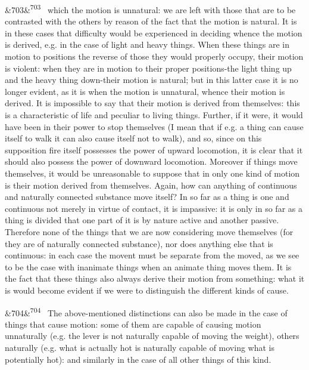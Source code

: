 \documentclass[12pt]{article}
\newcommand{\para}[1][]{\par\noindent\ifx&#1&\else\textsuperscript{\footnotesize #1}~\fi}
\begin{document}
\para[703] which the motion is unnatural: we are left with those that are to be contrasted with the others by reason of the fact that the motion is natural. It is in these cases that difficulty would be experienced in deciding whence the motion is derived, e.g. in the case of light and heavy things. When these things are in motion to positions the reverse of those they would properly occupy, their motion is violent: when they are in motion to their proper positions-the light thing up and the heavy thing down-their motion is natural; but in this latter case it is no longer evident, as it is when the motion is unnatural, whence their motion is derived. It is impossible to say that their motion is derived from themselves: this is a characteristic of life and peculiar to living things. Further, if it were, it would have been in their power to stop themselves (I mean that if e.g. a thing can cause itself to walk it can also cause itself not to walk), and so, since on this supposition fire itself possesses the power of upward locomotion, it is clear that it should also possess the power of downward locomotion. Moreover if things move themselves, it would be unreasonable to suppose that in only one kind of motion is their motion derived from themselves. Again, how can anything of continuous and naturally connected substance move itself? In so far as a thing is one and continuous not merely in virtue of contact, it is impassive: it is only in so far as a thing is divided that one part of it is by nature active and another passive. Therefore none of the things that we are now considering move themselves (for they are of naturally connected substance), nor does anything else that is continuous: in each case the movent must be separate from the moved, as we see to be the case with inanimate things when an animate thing moves them. It is the fact that these things also always derive their motion from something: what it is would become evident if we were to distinguish the different kinds of cause.

\para[704] The above-mentioned distinctions can also be made in the case of things that cause motion: some of them are capable of causing motion unnaturally (e.g. the lever is not naturally capable of moving the weight), others naturally (e.g. what is actually hot is naturally capable of moving what is potentially hot): and similarly in the case of all other things of this kind.
\end{document}
